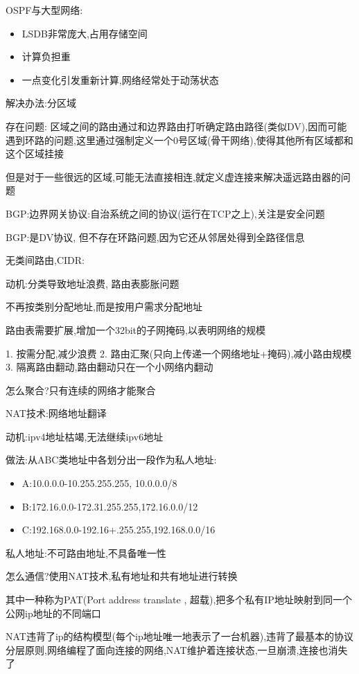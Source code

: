 \documentclass[UTF8,a4paper]{ctexart}
\begin{document}
OSPF与大型网络:
\begin{itemize}
  \item LSDB非常庞大,占用存储空间
  \item 计算负担重
  \item 一点变化引发重新计算,网络经常处于动荡状态
\end{itemize}

解决办法:分区域

存在问题:
区域之间的路由通过和边界路由打听确定路由路径(类似DV),因而可能遇到环路的问题,这里通过强制定义一个0号区域(骨干网络),使得其他所有区域都和这个区域挂接

但是对于一些很远的区域,可能无法直接相连,就定义虚连接来解决遥远路由器的问题

BGP:边界网关协议:自治系统之间的协议(运行在TCP之上),关注是安全问题

BGP:是DV协议, 但不存在环路问题,因为它还从邻居处得到全路径信息

无类间路由,CIDR:

动机:分类导致地址浪费, 路由表膨胀问题

不再按类别分配地址,而是按用户需求分配地址

路由表需要扩展,增加一个32bit的子网掩码,以表明网络的规模

1. 按需分配,减少浪费
2. 路由汇聚(只向上传递一个网络地址+掩码),减小路由规模
3. 隔离路由翻动,路由翻动只在一个小网络内翻动

怎么聚合?只有连续的网络才能聚合

NAT技术:网络地址翻译

动机:ipv4地址枯竭,无法继续ipv6地址

做法:从ABC类地址中各划分出一段作为私人地址:
\begin{itemize}
  \item A:10.0.0.0-10.255.255.255, 10.0.0.0/8
  \item B:172.16.0.0-172.31.255.255,172.16.0.0/12
  \item C:192.168.0.0-192.16+.255.255,192.168.0.0/16
\end{itemize}

 私人地址:不可路由地址,不具备唯一性

 怎么通信?使用NAT技术,私有地址和共有地址进行转换

其中一种称为PAT(Port address translate , 超载),把多个私有IP地址映射到同一个公网ip地址的不同端口

NAT违背了ip的结构模型(每个ip地址唯一地表示了一台机器),违背了最基本的协议分层原则,网络编程了面向连接的网络,NAT维护着连接状态,一旦崩溃,连接也消失了
\end{document}
